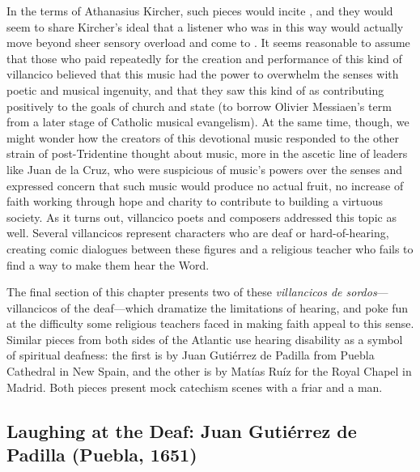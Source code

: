 In the terms of Athanasius Kircher, such pieces would incite , and they would seem to share Kircher's ideal that a listener who was  in this way would actually move beyond sheer sensory overload and come to .
\Autocite[bk.~7, p.~550]{Kircher:Musurgia}  It seems reasonable to assume that those who paid repeatedly for the creation and performance of this kind of villancico believed that this music had the power to overwhelm the senses with poetic and musical ingenuity, and that they saw this kind of  as contributing positively to the goals of church and state (to borrow Olivier Messiaen's term from a later stage of Catholic musical evangelism).
At the same time, though, we might wonder how the creators of this devotional music responded to the other strain of post-Tridentine thought about music, more in the ascetic line of leaders like Juan de la Cruz, who were suspicious of music's powers over the senses and expressed concern that such music would produce no actual fruit, no increase of faith working through hope and charity to contribute to building a virtuous society.
As it turns out, villancico poets and composers addressed this topic as well.
Several villancicos represent characters who are deaf or hard-of-hearing, creating comic dialogues between these figures and a religious teacher who fails to find a way to make them hear the Word.

The final section of this chapter presents two of these \emph{villancicos de sordos}---villancicos of the deaf---which dramatize the limitations of hearing, and poke fun at the difficulty some religious teachers faced in making faith appeal to this sense.
Similar pieces from both sides of the Atlantic use hearing disability as a symbol of spiritual deafness: the first is by Juan Gutiérrez de Padilla from Puebla Cathedral in New Spain, and the other is by Matías Ruíz for the Royal Chapel in Madrid.
Both pieces present mock catechism scenes with a friar and a  man.


\subsection{Laughing at the Deaf: Juan Gutiérrez de Padilla (Puebla, 1651)}

